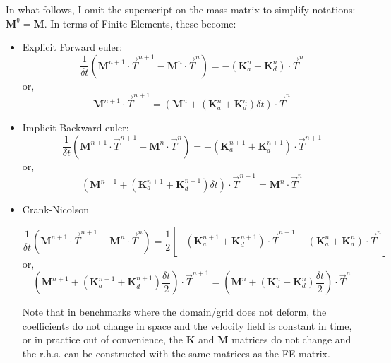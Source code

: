 In what follows, I omit the superscript on the mass matrix to simplify notations: ${\bm M}^\uptheta={\bm M}$.
In terms of Finite Elements, these become:
\begin{itemize}
\item Explicit Forward euler:
\[
\frac{1}{\delta t} ({\bm M}^{n+1} \cdot \vec T^{n+1}  -{\bm M}^n \cdot \vec T^{n} )
=
-({\bm K}_a^n+{\bm K}^n_d) \cdot \vec T^{n}
\]
or, 
\[
\boxed{
{\bm M}^{n+1} \cdot \vec T^{n+1}
= \left(  {\bm M}^n  + ({\bm K}_a^n+{\bm K}_d^n) \delta t \right)\cdot \vec T^{n} 
}
\]

\item Implicit Backward euler:
\[
\frac{1}{\delta t} ({\bm M}^{n+1} \cdot \vec T^{n+1}  -{\bm M}^n \cdot \vec T^{n} )
= -({\bm K}_a^{n+1}+{\bm K}_d^{n+1}) \cdot \vec T^{n+1}
\]
or, 
\[
\boxed{
\left( {\bm M}^{n+1} +({\bm K}_a^{n+1}+{\bm K}_d^{n+1})\delta t \right) \cdot \vec T^{n+1}
=
{\bm M}^n \cdot \vec T^{n} 
}
\]

\item Crank-Nicolson

\[
\frac{1}{\delta t} \left({\bm M}^{n+1} \cdot \vec T^{n+1}  -{\bm M}^n \cdot \vec T^{n} \right)
= 
\frac{1}{2}
\left[
-({\bm K}_a^{n+1}+{\bm K}_d^{n+1}) \cdot \vec T^{n+1}
-({\bm K}_a^{n}+{\bm K}_d^{n}) \cdot \vec T^{n}
\right]
\]
or,
\[
\boxed{
\left( {\bm M}^{n+1} +({\bm K}_a^{n+1}+{\bm K}_d^{n+1})\frac{\delta t}{2} \right) \cdot \vec T^{n+1}
= \left(  {\bm M}^n  + ({\bm K}_a^n+{\bm K}_d^n) \frac{\delta t}{2} \right)\cdot \vec T^{n} 
}
\]

Note that in benchmarks where the domain/grid does not deform, the coefficients do not change in space
and the velocity field is constant in time, or in practice out of convenience, the ${\bm K}$  and ${\bm M}$ 
matrices do not change and the r.h.s. can be constructed with the same matrices as the FE matrix.

\end{itemize}




